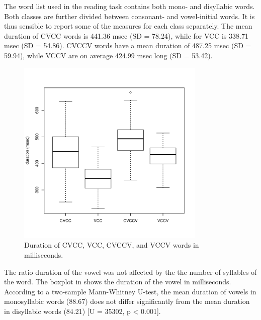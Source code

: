 \documentclass[11pt,a4paper,openany]{memoir}\usepackage[]{graphicx}\usepackage[]{color}
\newenvironment{knitrout}{}{} %
\begin{document}
The word list used in the reading task contains both mono- and disyllabic words.
Both classes are further divided between consonant- and vowel-initial words.
It is thus sensible to report some of the measures for each class separately.
The mean duration of CVCC words is 441.36 msec (SD = 78.24), while for VCC is 338.71 msec (SD = 54.86).
CVCCV words have a mean duration of 487.25 msec (SD = 59.94), while VCCV are on average 424.99 msec long (SD = 53.42).

\begin{figure}
\centering
\begin{knitrout}
\color{fgcolor}
\includegraphics[width=0.8\textwidth]{img/word-duration-1} 

\end{knitrout}
\caption{Duration of CVCC, VCC, CVCCV, and VCCV words in milliseconds.}
\label{f:worddur}
\end{figure}



The ratio duration of the vowel was not affected by the the number of syllables of the word.
The boxplot in  shows the duration of the vowel in milliseconds.
According to a two-sample Mann-Whitney U-test, the mean duration of vowels in monosyllabic words (88.67) does not differ significantly from the mean duration in disyllabic words (84.21) [U = 35302, p < 0.001].
\end{document}
